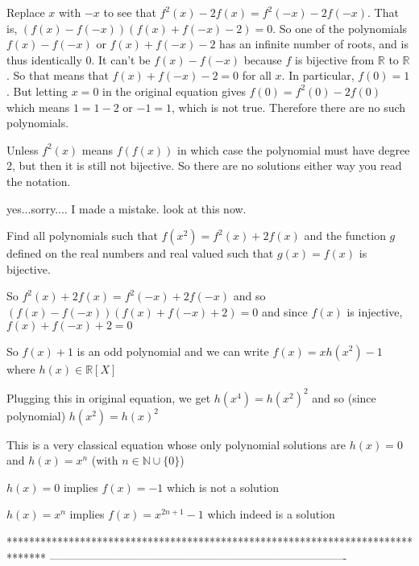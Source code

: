 \begin{solution}
	Replace $x$ with $-x$ to see that $f^2(x)-2f(x)=f^2(-x)-2f(-x)$.  That is, $(f(x)-f(-x))(f(x)+f(-x)-2)=0$.  So one of the polynomials $f(x)-f(-x)$ or $f(x)+f(-x)-2$ has an infinite number of roots, and is thus identically 0.  It can't be $f(x)-f(-x)$ because $f$ is bijective from $\mathbb{R}$ to $\mathbb{R}$.  So that means that $f(x)+f(-x)-2=0$ for all $x$.  In particular, $f(0)=1$.  But letting $x=0$ in the original equation gives $f(0)=f^2(0)-2f(0)$ which means $1=1-2$ or $-1=1$, which is not true.  Therefore there are no such polynomials.

Unless $f^2(x)$ means $f(f(x))$ in which case the polynomial must have degree 2, but then it is still not bijective.  So there are no solutions either way you read the notation.
\end{solution}



\begin{solution}
	yes...sorry.... I made a mistake. look at this now.
\end{solution}



\begin{solution}
	\begin{tcolorbox}Find all polynomials such that $ f(x^{2})=f^{2}(x)+2f(x) $ and the function $ g $ defined on the real numbers and real valued such that $ g(x)=f(x) $ is bijective.\end{tcolorbox}
So $f^2(x)+2f(x)=f^2(-x)+2f(-x)$ and so $(f(x)-f(-x))(f(x)+f(-x)+2)=0$ and since $f(x)$ is injective, $f(x)+f(-x)+2=0$

So $f(x)+1$ is an odd polynomial and we can write $f(x)=xh(x^2)-1$ where $h(x)\in\mathbb R[X]$

Plugging this in original equation, we get $h(x^4)=h(x^2)^2$ and so (since polynomial) $h(x^2)=h(x)^2$

This is a very classical equation whose only polynomial solutions are $h(x)=0$ and $h(x)=x^n$ (with $n\in\mathbb N\cup\{0\}$)

$h(x)=0$ implies $f(x)=-1$ which is not a solution

$h(x)=x^n$ implies $\boxed{f(x)=x^{2n+1}-1}$ which indeed is a solution
\end{solution}
*******************************************************************************
-------------------------------------------------------------------------------

